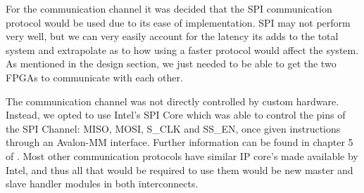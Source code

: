 For the communication channel it was decided that the SPI communication protocol would be used due to its ease of implementation. SPI may not perform very well, but we can very easily account for the latency its adds to the total system and extrapolate as to how using a faster protocol would affect the system. As mentioned in the design section, we just needed to be able to get the two FPGAs to communicate with each other.

The communication channel was not directly controlled by custom hardware. Instead, we opted to use Intel's SPI Core which was able to control the pins of the SPI Channel: MISO, MOSI, S\_CLK and SS\_EN, once given instructions through an Avalon-MM interface. Further information can be found in chapter 5 of \cite{intel-embedded-periph}. Most other communication protocols have similar IP core's made available by Intel, and thus all that would be required to use them would be new master and slave handler modules in both interconnects.